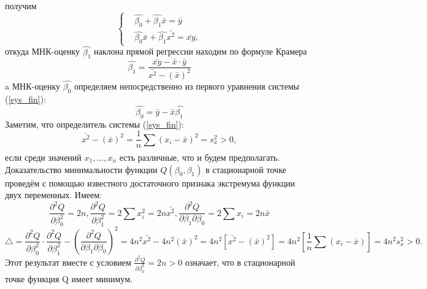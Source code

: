 \documentclass[a4paper]{article}
\begin{document}
	получим
		\begin{equation}
	   \begin{cases}
         & \hat{\beta_{0}} + \hat{\beta_{1}}\bar{x} = 
         \bar{y}\\ 
        & \hat{\beta_{0}}\bar{x} + \hat{\beta_{1}}\bar{x^{2}} = \bar{xy},
       \end{cases}
       \label{sys_fin}
	\end{equation}
	откуда МНК-оценку $\hat{\beta_1}$ наклона прямой регрессии находим по формуле Крамера
	\begin{equation}
	    \hat{\beta_{1}} = \frac{\bar{xy} - \bar{x} \cdot \bar{y}}{\bar{x^{2}} - (\bar{x})^{2}}
	    \label{beta_1_new}
	\end{equation}
	a МНК-оценку $\hat{\beta_0}$  определяем непосредственно из первого уравнения системы (\ref{sys_fin}):
	\begin{equation}
	    \hat{\beta_{0}} = \bar{y} - \bar{x}\hat{\beta_{1}}
	    \label{beta_0_new}
	\end{equation}
	Заметим, что определитель системы (\ref{sys_fin}):
	\begin{equation}
	    \bar{x^{2}} - (\bar{x})^{2} = \frac{1}{n}\sum_{}{}{(x_{i} - \bar{x})^{2}} = s_{x}^{2} > 0, 
	\end{equation}
	если среди значений $x_{1},...,x_{n}$ есть различные, что и будем предполагать.
	\newline
	Доказательство минимальности функции $Q(\beta_{0}, \beta_{1})$ в стационарной точке проведём с помощью известного достаточного признака экстремума функции двух переменных. Имеем:
	\begin{equation}
	    \frac{\partial ^{2} Q}{\partial \beta_{0}^{2}} = 2n, 
        \frac{\partial ^{2} Q}{\partial \beta_{1}^{2}} = 2\sum_{}{}{x_{i}^{2}} = 2n\bar{x^{2}}, 
        \frac{\partial ^{2} Q}{\partial \beta_{1} \partial \beta_{0}} = 2\sum_{}{}{x_{i}} = 2n\bar{x}
        \label{frac_eq}
	\end{equation}
	\begin{equation}
	    \bigtriangleup = \frac{\partial^{2}Q}{\partial \beta_{0}^{2}} \cdot \frac{\partial^{2}Q}{\partial \beta_{1}^{2}} - (\frac{\partial^{2}Q}{\partial \beta_{1} \partial \beta_{0}})^{2} = 
	    4n^{2}\bar{x^{2}} - 4n^2(\bar{x})^{2} = 
	    4n^{2}\left[\bar{x^{2}} - (\bar{x})^{2}\right] = 4n^{2}\left[ \frac{1}{n}\sum{}_{}{(x_{i} - \bar{x})}\right] = 4n^{2}s_{x}^{2} > 0.
	    \label{det_sys}
	\end{equation}
	Этот результат вместе с условием $\frac{\partial^{2}Q}{\partial \beta_{0}^{2}} = 2n > 0$ означает, что в стационарной точке функция Q имеет минимум.
\end{document}
